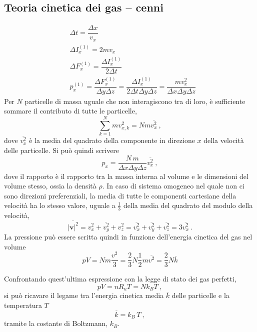 \subsection{Teoria cinetica dei gas -- cenni}
\begin{equation}
\begin{aligned}
    & \Delta t = \dfrac{\Delta x}{v_x} \\
    & \Delta I^{(1)}_x = 2 m v_x \\
    & \Delta F^{(1)}_x = \dfrac{\Delta I^{(1)}_x}{2 \Delta t} \\
    & p^{(1)}_x = \dfrac{\Delta F^{(1)}_x}{\Delta y \Delta z} = \dfrac{\Delta I^{(1)}_x}{2 \Delta t \Delta y \Delta z} 
          = \dfrac{m v_x^2}{\Delta x \Delta y \Delta z}
\end{aligned}
\end{equation}
Per $N$ particelle di massa uguale che non interagiscono tra di loro, è sufficiente sommare il contributo di tutte le particelle,
\begin{equation}
    \sum_{k=1}^N m v_{x,k}^2 = N m \overline{v_x^2} \ ,
\end{equation}
dove $\overline{v_x^2}$ è la media del quadrato della componente in direzione $x$ della velocità delle particelle. Si può quindi scrivere
\begin{equation}
    p_x = \dfrac{N \, m}{\Delta x \Delta y \Delta z} \overline{ v_x^2 } \ ,
\end{equation}
dove il rapporto è il rapporto tra la massa interna al volume e le dimensioni del volume stesso, ossia la densità $\rho$.
In caso di sistema omogeneo nel quale non ci sono direzioni preferenziali, la media di tutte le componenti cartesiane della velocità ha lo stesso valore, uguale a $\frac{1}{3}$ della media del quadrato del modulo della velocità,
\begin{equation}
   \overline{|\mathbf{v}|^2} = 
    \overline{v_x^2 + v_y^2 + v_z^2} = \overline{v_x^2} + \overline{v_y^2} + \overline{v_z^2} = 3 \overline{v_x^2} \ . 
\end{equation}
La pressione può essere scritta quindi in funzione dell'energia cinetica del gas nel volume
\begin{equation}
    p V = N m \frac{v^2}{3} = \dfrac{2}{3} N \dfrac{1}{2} m \overline{v^2} = \dfrac{2}{3} N \overline{k}
\end{equation}

\noindent
Confrontando quest'ultima espressione con la legge di stato dei gas perfetti,
\begin{equation}
   p V = n R_u T = N k_B T \ ,
\end{equation}
si può ricavare il legame tra l'energia cinetica media $\overline{k}$ delle particelle e la temperatura $T$
\begin{equation}
    \overline{k} = k_B \, T \ ,
\end{equation}
tramite la costante di Boltzmann, $k_B$.

